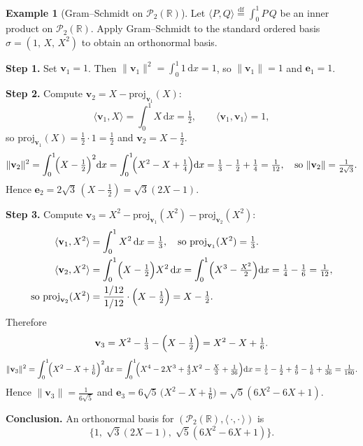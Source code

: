 \documentclass[11pt, a4paper, notitlepage]{report}
\theoremstyle{definition}
\newtheorem{example}[theorem]{Example}
\theoremstyle{remark}
\begin{document}
\begin{example}[Gram--Schmidt on $\mathscr{P}_2(\mathbb{R})$]
\label{ex:GS-P2}
Let $\langle P,Q\rangle \stackrel{\mathrm{df}}{=} \int_0^1 P\,Q$ be an inner product on
$\mathscr{P}_2(\mathbb{R})$.
Apply Gram--Schmidt to the standard ordered basis
$\sigma = (1,\,X,\,X^2)$ to obtain an orthonormal basis.

\medskip
\textbf{Step 1.} Set $\mathbf{v}_1 = 1$.
Then $\|\mathbf{v}_1\|^2 = \int_0^1 1\,\mathrm{d}x = 1$, so $\|\mathbf{v}_1\| = 1$
and $\mathbf{e}_1 = 1$.

\medskip
\textbf{Step 2.} Compute $\mathbf{v}_2 = X - \mathrm{proj}_{\mathbf{v}_1}(X)$:
\[
  \langle\mathbf{v}_1,X\rangle = \int_0^1 X\,\mathrm{d}x = \tfrac{1}{2},
  \qquad
  \langle\mathbf{v}_1,\mathbf{v}_1\rangle = 1,
\]
so $\mathrm{proj}_{\mathbf{v}_1}(X) = \tfrac{1}{2}\cdot 1 = \tfrac{1}{2}$
and $\mathbf{v}_2 = X - \tfrac{1}{2}$.
\[
  \|\mathbf{v}_2\|^2 = \int_0^1\!\Bigl(X-\tfrac{1}{2}\Bigr)^2\mathrm{d}x
  = \int_0^1\!\Bigl(X^2-X+\tfrac{1}{4}\Bigr)\mathrm{d}x
  = \tfrac{1}{3}-\tfrac{1}{2}+\tfrac{1}{4} = \tfrac{1}{12},
  \quad\text{so }\|\mathbf{v}_2\| = \tfrac{1}{2\sqrt{3}}.
\]
Hence $\mathbf{e}_2 = 2\sqrt{3}\,(X-\tfrac{1}{2}) = \sqrt{3}(2X-1)$.

\medskip
\textbf{Step 3.} Compute $\mathbf{v}_3 = X^2
   - \mathrm{proj}_{\mathbf{v}_1}(X^2) - \mathrm{proj}_{\mathbf{v}_2}(X^2)$:
\begin{align*}
  \langle\mathbf{v}_1,X^2\rangle &= \int_0^1 X^2\,\mathrm{d}x = \tfrac{1}{3},
  \quad\text{so }\mathrm{proj}_{\mathbf{v}_1}(X^2) = \tfrac{1}{3}.\\
  \langle\mathbf{v}_2,X^2\rangle &= \int_0^1\Bigl(X-\tfrac{1}{2}\Bigr)X^2\,\mathrm{d}x
    = \int_0^1\Bigl(X^3-\tfrac{X^2}{2}\Bigr)\mathrm{d}x
    = \tfrac{1}{4}-\tfrac{1}{6} = \tfrac{1}{12},\\
  \text{so }\mathrm{proj}_{\mathbf{v}_2}(X^2) &= \frac{1/12}{1/12}\cdot\Bigl(X-\tfrac{1}{2}\Bigr) = X-\tfrac{1}{2}.
\end{align*}
Therefore
\[
  \mathbf{v}_3 = X^2 - \tfrac{1}{3} - \Bigl(X-\tfrac{1}{2}\Bigr) = X^2 - X + \tfrac{1}{6}.
\]
\[
  \|\mathbf{v}_3\|^2 = \int_0^1\!\Bigl(X^2-X+\tfrac{1}{6}\Bigr)^2\mathrm{d}x
  = \int_0^1\!\Bigl(X^4-2X^3+\tfrac{4}{3}X^2-\tfrac{X}{3}+\tfrac{1}{36}\Bigr)\mathrm{d}x
  = \tfrac{1}{5}-\tfrac{1}{2}+\tfrac{4}{9}-\tfrac{1}{6}+\tfrac{1}{36}
  = \tfrac{1}{180}.
\]
Hence $\|\mathbf{v}_3\| = \tfrac{1}{6\sqrt{5}}$ and
$\mathbf{e}_3 = 6\sqrt{5}\,\bigl(X^2-X+\tfrac{1}{6}\bigr) = \sqrt{5}(6X^2-6X+1)$.

\medskip
\textbf{Conclusion.} An orthonormal basis for $(\mathscr{P}_2(\mathbb{R}),\langle\,\cdot,\cdot\,\rangle)$ is
\[
  \bigl\{1,\;\sqrt{3}(2X-1),\;\sqrt{5}(6X^2-6X+1)\bigr\}.
\]
\end{example}
\end{document}
